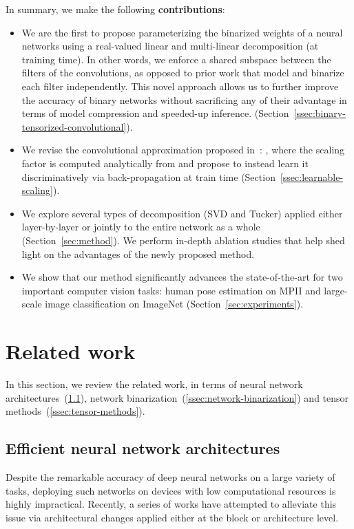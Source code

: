 \documentclass[10pt,twocolumn,letterpaper]{article}
\begin{document}
In summary, we make the following \textbf{contributions}:
\begin{itemize}
    \item We are the first to propose parameterizing the binarized weights of a neural networks using a real-valued linear and multi-linear decomposition (at training time). In other words, we enforce a shared subspace between the filters of the convolutions, as opposed to prior work that model and binarize each filter independently. This novel approach allows us to further improve the accuracy of binary networks
    without sacrificing any of their advantage in terms of model compression and speeded-up inference.
    (Section~\ref{ssec:binary-tensorized-convolutional}).
    
    \item We revise the convolutional approximation proposed in~\cite{rastegari2016xnor}: , where the scaling factor  is computed analytically from   and propose to instead learn it discriminatively via back-propagation at train time (Section~\ref{ssec:learnable-scaling}).
    
    \item We explore several types of decomposition (SVD and Tucker) applied either layer-by-layer or jointly to the entire network as a whole (Section~\ref{sec:method}). We perform in-depth ablation studies that help shed light on the advantages of the newly proposed method.
    
    \item We show that our method significantly advances the state-of-the-art for two important computer vision tasks: human pose estimation on MPII and large-scale image classification on ImageNet (Section~\ref{sec:experiments}).
\end{itemize} \section{Related work}\label{sec:related-work}
In this section, we review the related work, in terms of neural network architectures~(\ref{ssec:efficient-cnns}), network binarization~(\ref{ssec:network-binarization}) and tensor methods~(\ref{ssec:tensor-methods}).

\subsection{Efficient neural network architectures}\label{ssec:efficient-cnns}
 Despite the remarkable accuracy of deep neural networks on a large variety of tasks, deploying such networks on devices with low computational resources is highly impractical. Recently, a series of works have attempted to alleviate this issue via architectural changes applied either at the block or architecture level.
\end{document}
